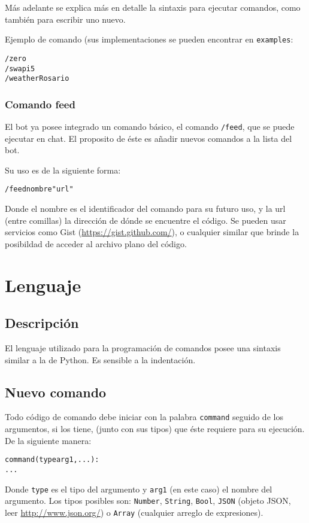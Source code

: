 \documentclass[12pt,a4paper,final]{article}
\begin{document}
Más adelante se explica más en detalle la sintaxis para ejecutar comandos, como también para escribir uno nuevo.

Ejemplo de comando (sus implementaciones se pueden encontrar en \texttt{examples}:

\begin{alltt}
/zero
/swapi 5
/weather Rosario
\end{alltt}

\subsubsection{Comando feed}
El bot ya posee integrado un comando básico, el comando \texttt{/feed}, que se puede ejecutar en chat. El proposito de éste es añadir nuevos comandos a la lista del bot.
\clearpage

Su uso es de la siguiente forma:

\begin{alltt}
/feed nombre "url"
\end{alltt}

Donde el nombre es el identificador del comando para su futuro uso, y la url (entre comillas) la dirección de dónde se encuentre el código. Se pueden usar servicios como Gist (\url{https://gist.github.com/}), o cualquier similar que brinde la posibildad de acceder al archivo plano del código.

\section{Lenguaje}

\subsection{Descripción}
El lenguaje utilizado para la programación de comandos posee una sintaxis similar a la de Python. Es sensible a la indentación. 

\subsection{Nuevo comando}
Todo código de comando debe iniciar con la palabra \texttt{command} seguido de los argumentos, si los tiene, (junto con sus tipos) que éste requiere para su ejecución. De la siguiente manera:
\begin{alltt}
command (type arg1 , ...):
  ...
\end{alltt}

Donde \texttt{type} es el tipo del argumento y \texttt{arg1} (en este caso) el nombre del argumento. Los tipos posibles son: \texttt{Number}, \texttt{String}, \texttt{Bool}, \texttt{JSON} (objeto JSON, leer \url{http://www.json.org/}) o \texttt{Array} (cualquier arreglo de expresiones).
\end{document}

